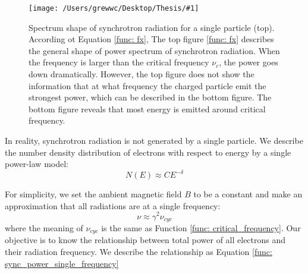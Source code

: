 \documentclass[12pt]{report}
\newcommand{\singleFig}[3]{
  \begin{figure}[!ht]
    \centering
    \texttt{[image: /Users/grewwc/Desktop/Thesis/\#1]}
    \caption{#3}
    \label{fig: #1}
  \end{figure}
}
\begin{document}
            \singleFig{sync_spectrum_loglog_combined}{0.5}{Spectrum shape of synchrotron 
            radiation for a single particle (top). According ot Equation \ref{func: fx},
            The top figure \ref{func: fx} describes the general shape of power spectrum of 
            synchrotron radiation. When the frequency is larger than
            the critical frequency $\nu_c$, the power goes down dramatically. However, the 
            top figure does not show the information that at what frequency the charged 
            particle emit the strongest power, which can be described in the bottom figure. 
            The bottom figure reveals that most energy is emitted around critical frequency.}
  
            In reality, synchrotron radiation is not generated by a single particle. We 
            describe the number density distribution of electrons with respect to energy by a 
            single power-law model:
            \begin{equation}
              \label{func: sync_number_density}
              N\left(E\right) \approx C E^{-\delta}
            \end{equation}
          
            For simplicity, we set the ambient magnetic field $B$ to be a constant and make an 
            approximation that all radiations are at a single frequency:
            \begin{equation}
              \label{func: sync_approximation}
              \nu \approx \gamma^2 \nu_{cyc}
            \end{equation}
            where the meaning of $\nu_{cyc}$ is the same as Function 
            \ref{func: critical_frequency}. Our objective is to know the relationship between 
            total power of all electrons and their radiation frequency. We describe the 
            relationship as Equation \ref{func: sync_power_single_frequency}
            
\end{document}
